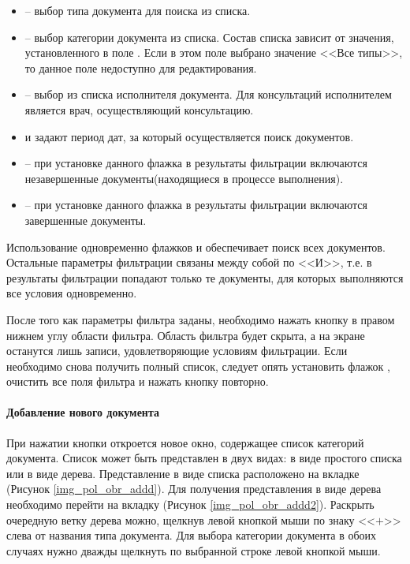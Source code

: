 \begin{itemize}
 \item {} – выбор типа документа для поиска из списка.
 \item {} – выбор категории документа из списка. Состав списка зависит от значения, установленного в поле . Если в этом поле выбрано значение <<Все типы>>, то данное поле недоступно для редактирования.
 \item {} – выбор из списка исполнителя документа. Для консультаций исполнителем является врач, осуществляющий консультацию.
 \item {} и  задают период дат, за который осуществляется поиск документов.
 \item {} – при установке данного флажка в результаты фильтрации включаются незавершенные документы(находящиеся в процессе выполнения).
 \item {} – при установке данного флажка в результаты фильтрации включаются завершенные документы.
\end{itemize}
 
Использование одновременно флажков  и  обеспечивает поиск всех документов. Остальные параметры фильтрации связаны между собой по <<И>>, т.е. в результаты фильтрации попадают только те документы, для которых выполняются все условия одновременно.

После того как параметры фильтра заданы, необходимо нажать кнопку  в правом нижнем углу области фильтра. Область фильтра будет скрыта, а на экране останутся лишь записи, удовлетворяющие условиям фильтрации. Если необходимо снова получить полный список, следует опять установить флажок , очистить все поля фильтра и нажать кнопку  повторно.

\paragraph{Добавление нового документа} \label{pol_obr_mdnew}

При нажатии кнопки   откроется новое окно, содержащее список категорий документа. Список может быть представлен в двух видах: в виде простого списка или в виде дерева. Представление в виде списка расположено на вкладке  (Рисунок \ref{img_pol_obr_addd}). Для получения представления в виде дерева необходимо перейти на вкладку  (Рисунок \ref{img_pol_obr_addd2}). Раскрыть очередную ветку дерева можно, щелкнув левой кнопкой мыши по знаку <<$+$>> слева от названия типа документа. Для выбора категории документа в обоих случаях нужно дважды щелкнуть по выбранной строке левой кнопкой мыши.

